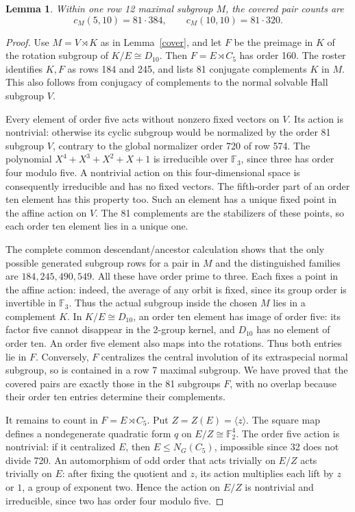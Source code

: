 \documentclass[11pt,a4paper]{article}
\newtheorem{lemma}{Lemma}\newtheorem{theorem}{Theorem}
\begin{document}
\begin{lemma}\label{affine}
Within one row 12 maximal subgroup $M$, the covered pair counts are
\[
 c_M(5,10)=81\cdot384,\qquad c_M(10,10)=81\cdot320.
\]
\end{lemma}
\begin{proof}
Use $M=V\rtimes K$ as in Lemma~\ref{cover}, and let $F$ be the
preimage in $K$ of the rotation subgroup of $K/E\cong D_{10}$.
Then $F=E\rtimes C_5$ has order 160. The roster identifies $K,F$
as rows 184 and 245, and lists 81 conjugate complements $K$ in
$M$. This also follows from conjugacy of complements to the
normal solvable Hall subgroup $V$.

Every element of order five acts without nonzero fixed vectors
on $V$. Its action is nontrivial: otherwise its cyclic subgroup
would be normalized by the order 81 subgroup $V$, contrary to
the global normalizer order 720 of row 574. The polynomial
$X^4+X^3+X^2+X+1$ is irreducible over $\mathbb F_3$, since three
has order four modulo five. A nontrivial action on this
four-dimensional space is consequently irreducible and has no
fixed vectors. The fifth-order part of an order ten element has
this property too. Such an element has a unique fixed point in
the affine action on $V$. The 81 complements are the stabilizers
of these points, so each order ten element lies in a unique one.

The complete common descendant/ancestor calculation shows that
the only possible generated subgroup rows for a pair in $M$
and the distinguished families are $184,245,490,549$. All these
have order prime to three. Each fixes a point in the affine action:
indeed, the average of any orbit is fixed, since its group order
is invertible in $\mathbb F_3$. Thus the actual subgroup inside
the chosen $M$ lies in a complement $K$. In $K/E\cong D_{10}$, an order ten
element has image of order five: its factor five cannot disappear
in the 2-group kernel, and $D_{10}$ has no element of order ten.
An order five element also maps into the rotations. Thus both
entries lie in $F$. Conversely, $F$ centralizes the central
involution of its extraspecial normal subgroup, so is contained
in a row 7 maximal subgroup. We have proved that the covered
pairs are exactly those in the 81 subgroups $F$, with no overlap
because their order ten entries determine their complements.

It remains to count in $F=E\rtimes C_5$. Put $Z=Z(E)=\langle z\rangle$.
The square map defines a nondegenerate quadratic form $q$ on
$E/Z\cong\mathbb F_2^4$. The order five action is nontrivial:
if it centralized $E$, then $E\leq N_G(C_5)$, impossible since
32 does not divide 720. An automorphism of odd order that acts
trivially on $E/Z$ acts trivially on $E$: after fixing the quotient
and $z$, its action multiplies each lift by $z$ or $1$, a group of
exponent two. Hence the action on $E/Z$ is nontrivial and
irreducible, since two has order four modulo five.


\end{proof}
\end{document}
